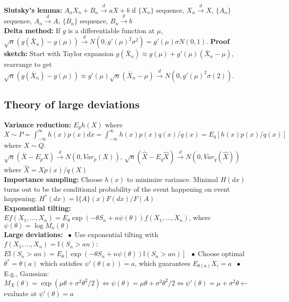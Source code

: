 \documentclass[9pt]{extarticle}
\newcommand*\bspace{$\; \bullet \;$}
\begin{document}
\textbf{Slutsky's lemma:} $A_nX_n + B_n \overset{d}{\rightarrow} aX + b$ if $\{X_n\}$ sequence, $X_n \overset{d}{\rightarrow} X$,  $\{A_n\}$ sequence, $A_n \overset{d}{\rightarrow} A$, $\{B_n\}$ sequence, $B_n \overset{p}{\rightarrow} b$\\
\textbf{Delta method:} If $g$ is a differentiable function at $\mu$, $\sqrt{n}(g(\bar{X}_n) - g(\mu)) \overset{d}{\longrightarrow} N(0, g'(\mu)^2\sigma^2) = g'(\mu)\sigma N(0,1)$. \textbf{Proof sketch:} Start with Taylor expansion $g(\bar{X}_n) \approx g(\mu) + g'(\mu)(\bar{X}_n - \mu)$, rearrange to get $ \sqrt{n}(g(\bar{X}_n) - g(\mu)) \approx g'(\mu)\sqrt{n}(\bar{X}_n - \mu) \overset{d}{\longrightarrow} N(0, g'(\mu)^2\sigma(2))$.


\subsection{Theory of large deviations}
\textbf{Variance reduction: } $E_ph(X)$ where $X \sim P = \int_{-\infty}^\infty h(x) p(x)dx = \int_{-\infty}^\infty h(x) p(x) q(x) / q(x) = E_q[h(x)p(x)/q(x)]$ where $X \sim Q$.\\
$\sqrt{n}(\overline{X} - E_pX) \overset{d}{\longrightarrow} N(0, Var_p(X))$, $\sqrt{n}(\overline{\hat{X}} - E_q\hat{X}) \overset{d}{\longrightarrow} N(0, Var_q(\hat{X}))$ where $\hat{X} = Xp(x)/q(X)$\\
\textbf{Importance sampling:} Choose $h(x)$ to minimize variance. Minimal $H(dx)$ turns out to be the conditional probability of the event happening on event happening: $H^*(dx) = \mathbb{I}\{A\}(x)F(dx)/F(A)$\\
\textbf{Exponential tilting:} $Ef(X_1, \dots, X_n) = E_\theta \exp(-\theta S_n + n \psi(\theta))f(X_1, \dots, X_n)$, where $\psi(\theta) = \log{M_x(\theta)}$\\
\textbf{Large deviations:} \bspace Use exponential tilting with $f(X_1, \dots, X_n) = \mathbb{I}(S_n > an)$: $E\mathbb{I}(S_n > an) = E_\theta[ \exp(-\theta S_n + n \psi(\theta))\mathbb{I}(S_n > an)]$ \bspace Choose optimal $\theta^* = \theta(a)$ which satisfies $\psi'(\theta(a)) = a$, which guarantees $E_{\theta(a)}X_i = a$ \bspace E.g., Gaussian: $M_X(\theta) = \exp(\mu\theta + \sigma^2\theta^2/2) \Longleftrightarrow \psi(\theta) = \mu\theta + \sigma^2\theta^2/2 \Longleftrightarrow \psi'(\theta) = \mu + \sigma^2\theta \leftarrow$ evaluate at $\psi'(\theta) = a$\\\\
\end{document}
